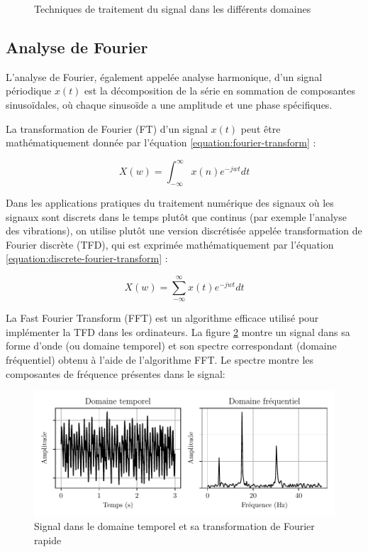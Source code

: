 \begin{figure}[h]
    \centering
	
    \caption{Techniques de traitement du signal dans les différents domaines}
    \label{fig:signal-processing}
\end{figure}


\subsection{Analyse de Fourier}
L'analyse de Fourier, également appelée analyse harmonique, d'un signal périodique $x(t)$ est la décomposition de la série en sommation de composantes sinusoïdales, où chaque sinusoïde a une amplitude et une phase spécifiques.

La transformation de Fourier (FT) d'un signal $x(t)$ peut être mathématiquement donnée par l'équation \ref{equation:fourier-transform} :

\begin{equation}
    X(w) = \int_{-\infty}^{\infty}x(n)e^{-jwt}dt
    \label{equation:fourier-transform}
\end{equation}

Dans les applications pratiques du traitement numérique des signaux où les signaux sont discrets dans le temps plutôt que continus (par exemple l'analyse des vibrations), on utilise plutôt une version discrétisée appelée transformation de Fourier discrète (TFD), qui est exprimée mathématiquement par l'équation \ref{equation:discrete-fourier-transform} :

\begin{equation}
    X(w) = \sum_{-\infty}^{\infty}x(t)e^{-jwt}dt
    \label{equation:discrete-fourier-transform}
\end{equation}

La Fast Fourier Transform (FFT) est un algorithme efficace utilisé pour implémenter la TFD dans les ordinateurs. La figure \ref{figure:fft} montre un signal dans sa forme d'onde (ou domaine temporel) et son spectre correspondant (domaine fréquentiel) obtenu à l'aide de l'algorithme FFT. Le spectre montre les composantes de fréquence présentes dans le signal:

\begin{figure}[h]
    \centering
    \includegraphics{figures/fft_fr.pdf}
    \caption{Signal dans le domaine temporel et sa transformation de Fourier rapide}
    \label{figure:fft}
\end{figure}


